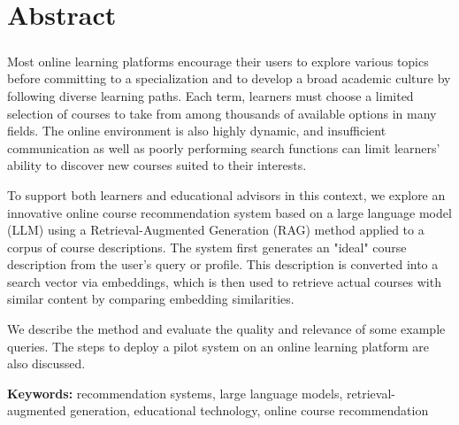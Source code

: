 \chapter*{Abstract}

\paragraph{}\begin{spacing}{2}

Most online learning platforms encourage their users to explore various topics before committing to a specialization and to develop a broad academic culture by following diverse learning paths. Each term, learners must choose a limited selection of courses to take from among thousands of available options in many fields. The online environment is also highly dynamic, and insufficient communication as well as poorly performing search functions can limit learners’ ability to discover new courses suited to their interests.

To support both learners and educational advisors in this context, we explore an innovative online course recommendation system based on a large language model (LLM) using a Retrieval-Augmented Generation (RAG) method applied to a corpus of course descriptions. The system first generates an "ideal" course description from the user’s query or profile. This description is converted into a search vector via embeddings, which is then used to retrieve actual courses with similar content by comparing embedding similarities.

We describe the method and evaluate the quality and relevance of some example queries. The steps to deploy a pilot system on an online learning platform are also discussed.

\medskip

\textbf{Keywords:} recommendation systems, large language models, retrieval-augmented generation, educational technology, online course recommendation
\end{spacing}